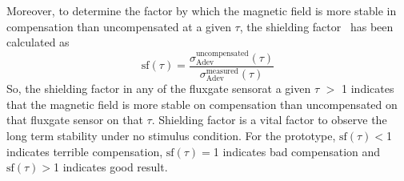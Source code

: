 

Moreover, to determine the factor by which the magnetic field is more stable in compensation than uncompensated at a given $\tau$, the shielding factor~\cite{bea} has been calculated as
\begin{equation}\label{eq:sf}
    \text{sf} (\tau)=\frac{\sigma_{\text{Adev}}^{\text{uncompensated}}(\tau)}{\sigma_{\text{Adev}}^{\text{measured}}(\tau)}
\end{equation}
So, the shielding factor in any of the fluxgate sensorat a given $\tau$  $>$ 1 indicates that the magnetic field is more stable on compensation than uncompensated on that fluxgate sensor on that $\tau$. Shielding factor is a vital factor to observe the long term stability under no stimulus condition. For the prototype, $\text{sf} (\tau)<$1 indicates terrible compensation, $\text{sf} (\tau)=$1 indicates bad compensation and $\text{sf} (\tau)>$1 indicates good result.
 

 
 
 
